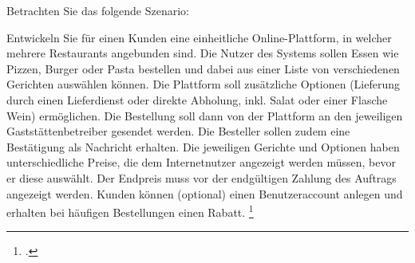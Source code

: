 \documentclass{bschlangaul-aufgabe}
\begin{document}

Betrachten Sie das folgende Szenario:

Entwickeln Sie für einen Kunden eine einheitliche Online-Plattform, in
welcher mehrere Restaurants angebunden sind. Die Nutzer des Systems
sollen Essen wie Pizzen, Burger oder Pasta bestellen und dabei aus einer
Liste von verschiedenen Gerichten auswählen können. Die Plattform soll
zusätzliche Optionen (\zB Lieferung durch einen Lieferdienst oder
direkte Abholung, inkl. Salat oder einer Flasche Wein) ermöglichen. Die
Bestellung soll dann von der Plattform an den jeweiligen
Gaststättenbetreiber gesendet werden. Die Besteller sollen zudem eine
Bestätigung als Nachricht erhalten. Die jeweiligen Gerichte und Optionen
haben unterschiedliche Preise, die dem Internetnutzer angezeigt werden
müssen, bevor er diese auswählt. Der Endpreis muss vor der endgültigen
Zahlung des Auftrags angezeigt werden. Kunden können (optional) einen
Benutzeraccount anlegen und erhalten bei häufigen Bestellungen einen
Rabatt.
\footcite{examen:66116:2020:09}
\end{document}
